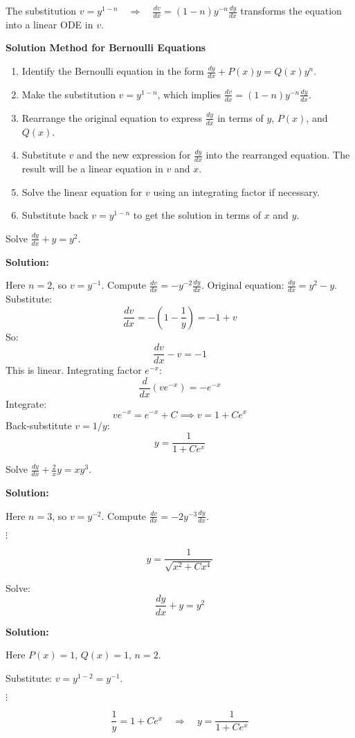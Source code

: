 The substitution $v = y^{1-n} \quad \Rightarrow \quad \frac{dv}{dx} = (1-n)y^{-n}\frac{dy}{dx}$ transforms the equation into a linear ODE in $v$.

\textbf{Solution Method for Bernoulli Equations}
\begin{enumerate}
    \item Identify the Bernoulli equation in the form $\frac{dy}{dx} + P(x)y = Q(x)y^n$.
    \item Make the substitution $v = y^{1-n}$, which implies $\frac{dv}{dx} = (1-n)y^{-n}\frac{dy}{dx}$.
    \item Rearrange the original equation to express $\frac{dy}{dx}$ in terms of $y$, $P(x)$, and $Q(x)$.
    \item Substitute $v$ and the new expression for $\frac{dy}{dx}$ into the rearranged equation. The result will be a linear equation in $v$ and $x$.
    \item Solve the linear equation for $v$ using an integrating factor if necessary.
    \item Substitute back $v=y^{1-n}$ to get the solution in terms of $x$ and $y$.
\end{enumerate}


\begin{example}
Solve $\displaystyle \frac{dy}{dx} + y = y^2$.

\textbf{Solution:}

Here $n=2$, so $v = y^{-1}$.
Compute $\frac{dv}{dx} = -y^{-2}\frac{dy}{dx}$.
Original equation: $\frac{dy}{dx} = y^2 - y$.
Substitute:
\[
\frac{dv}{dx} = - (1 - \frac{1}{y}) = -1 + v
\]
So:
\[
\frac{dv}{dx} - v = -1
\]
This is linear. Integrating factor $e^{-x}$:
\[
\frac{d}{dx}(ve^{-x}) = -e^{-x}
\]
Integrate:
\[
ve^{-x} = e^{-x} + C \implies v = 1 + Ce^{x}
\]
Back-substitute $v = 1/y$:
\[
y = \frac{1}{1 + Ce^{x}}
\]
\end{example}


\begin{example}
Solve $\displaystyle \frac{dy}{dx} + \frac{2}{x}y = xy^3$.

\textbf{Solution:}

Here $n=3$, so $v = y^{-2}$.
Compute $\frac{dv}{dx} = -2y^{-3}\frac{dy}{dx}$.

$\vdots$

$$
y = \frac{1}{\sqrt{x^2 + Cx^4}}
$$
\end{example}


\begin{example}
Solve:
$$
\frac{dy}{dx} + y = y^2
$$

\textbf{Solution:}

Here $P(x) = 1$, $Q(x) = 1$, $n=2$.

Substitute: $v = y^{1-2} = y^{-1}$.

$\vdots$

$$
\frac{1}{y} = 1 + Ce^x \quad \Rightarrow \quad y = \frac{1}{1 + Ce^x}
$$
\end{example}


